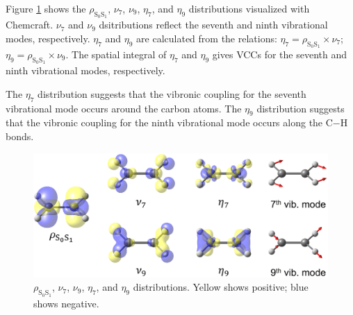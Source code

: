 ﻿\documentclass[11pt,a4paper,openany]{article}
\begin{document}
\indent
Figure \ref{fig:vcd} shows the $\rho_{\mathrm{S}_0\mathrm{S}_1}$, $\nu_7$, $\nu_9$, $\eta_7$, and $\eta_9$ distributions visualized with Chemcraft. $\nu_7$ and $\nu_9$ dsitributions reflect the seventh and ninth vibrational modes, respectively. $\eta_7$ and $\eta_9$ are calculated from the relations: $\eta_7 = \rho_{\mathrm{S}_0\mathrm{S}_1} \times \nu_7$; $\eta_9 = \rho_{\mathrm{S}_0\mathrm{S}_1} \times \nu_9$. The spatial integral of $\eta_7$ and $\eta_9$ gives VCCs for the seventh and ninth vibrational modes, respectively.

The $\eta_7$ distribution suggests that the vibronic coupling for the seventh vibrational mode occurs around the carbon atoms. 
The $\eta_9$ distribution suggests that the vibronic coupling for the ninth vibrational mode occurs along the C$-$H bonds.

\begin{figure}[h]
\centering
\includegraphics[width=15cm]{vcd.eps}
\caption{
$\rho_{\mathrm{S}_0\mathrm{S}_1}$, $\nu_7$, $\nu_9$, $\eta_7$, and $\eta_9$ distributions.
Yellow shows positive; blue shows negative.
}
\label{fig:vcd}
\end{figure}


\clearpage


\end{document}
